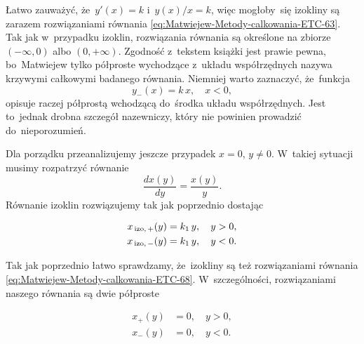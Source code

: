 \documentclass[a4paper,11pt]{article}
\numberwithin{equation}{section}
\begin{document}
Łatwo zauważyć, że~$y'( x ) = k$ i~$y( x ) / x = k$, więc mogłoby~się
izokliny są zarazem rozwiązaniami równania
\eqref{eq:Matwiejew-Metody-calkowania-ETC-63}. Tak jak w~przypadku izoklin,
rozwiązania równania są określone na zbiorze $( -\infty, 0 )$
albo $( 0, +\infty )$. Zgodność z~tekstem książki jest prawie pewna,
bo~Matwiejew tylko półproste wychodzące z~układu współrzędnych nazywa
krzywymi całkowymi badanego równania. Niemniej warto zaznaczyć, że~funkcja
\begin{equation}
  \label{eq:Matwiejew-Metody-calkowania-ETC-67}
  y_{ - }( x ) = k \, x, \quad
  x < 0,
\end{equation}
opisuje raczej półprostą wchodzącą do~środka układu współrzędnych. Jest
to~jednak drobna szczegół nazewniczy, który nie powinien prowadzić
do~nieporozumień.

Dla porządku przeanalizujemy jeszcze przypadek $x = 0$, $y \neq 0$. W~takiej
sytuacji musimy rozpatrzyć równanie
\begin{equation}
  \label{eq:Matwiejew-Metody-calkowania-ETC-68}
  \frac{ d x( y ) }{ d y } = \frac{ x( y ) }{ y }.
\end{equation}
Równanie izoklin rozwiązujemy tak jak poprzednio dostając

\negVerSpaceFour


\begin{subequations}

  \begin{align}
    \label{eq:Matwiejew-Metody-calkowania-ETC-69-A}
    x_{ \, \textrm{izo}, \, + }( y )
    &=
      k_{ 1 } \, y, \quad
      y > 0, \\
    \label{eq:Matwiejew-Metody-calkowania-ETC-69-B}
    x_{ \, \textrm{izo}, \, - }( y )
    &=
      k_{ 1 } \, y, \quad
      y < 0.
  \end{align}

\end{subequations}


\noindent
Tak jak poprzednio łatwo sprawdzamy, że~izokliny są też rozwiązaniami
równania \eqref{eq:Matwiejew-Metody-calkowania-ETC-68}. W~szczególności,
rozwiązaniami naszego równania są dwie półproste

\negVerSpaceFour


\begin{subequations}

  \begin{align}
    \label{eq:Matwiejew-Metody-calkowania-ETC-70-A}
    x_{ + }( y )
    &=
      0, \quad
      y > 0, \\
    \label{eq:Matwiejew-Metody-calkowania-ETC-70-B}
    x_{ - }( y )
    &=
      0, \quad
      y < 0.
  \end{align}

\end{subequations}
\end{document}
